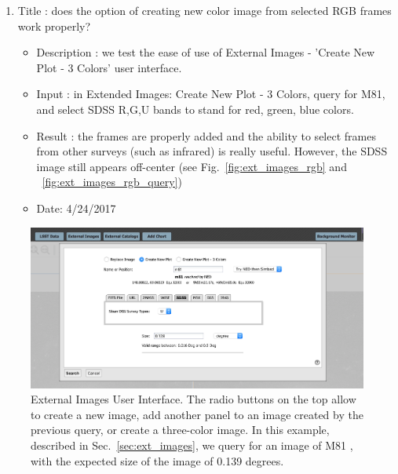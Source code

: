 \documentclass[DM,lsstdraft,toc,usenatbib]{lsstdoc}
\begin{document}
\begin{enumerate}
    \item Title : does the  option  of creating new color image from selected RGB frames work properly? 
    \begin{itemize}
      \item Description : we test the ease of use of External Images - 'Create New Plot - 3 Colors' user interface. 
      \item Input : in Extended Images: Create New Plot - 3 Colors,  query for M81, and select SDSS R,G,U bands to stand for red, green, blue colors. 
      \item Result : the frames are properly added and the ability to select frames from other surveys (such as infrared) is really useful. However, the SDSS image still appears off-center (see Fig.~\ref{fig:ext_images_rgb} and ~\ref{fig:ext_images_rgb_query})
      \item Date: 4/24/2017
    \end{itemize}
\end{enumerate}


\begin{figure}
\includegraphics[width=\textwidth]{figs/external_images_menu.png}
\caption{External Images User Interface. The radio buttons on the top allow to create a new image, add another panel to an image created by the previous query, or create a three-color image. In this example, described in Sec.~\ref{sec:ext_images}, we query for an image of M81 , with the expected size of the image of 0.139 degrees. }
\label{fig:ext_images}
\end{figure}
\end{document}
